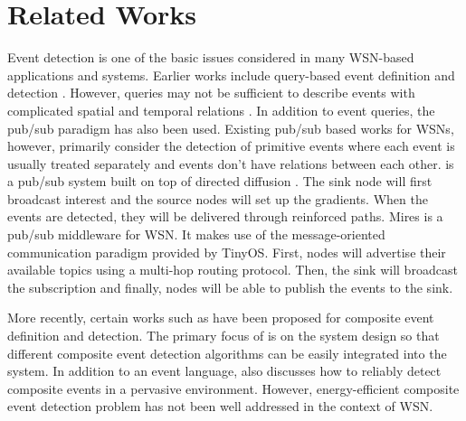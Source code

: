 \section{Related Works}
\label{sec:relatedworks}
Event detection is one of the basic issues considered in many WSN-based applications and systems. Earlier works include query-based event definition and detection \cite{tinydb}. However, queries may not be sufficient to describe events with complicated spatial and temporal relations \cite{cougar}. In addition to event queries, the pub/sub paradigm has also been used.  Existing pub/sub based works for WSNs, however, primarily consider the detection of primitive events where each event is usually treated separately and events don't have relations between each other. \cite{lowlevelnaming} is a pub/sub system built on top of directed diffusion \cite{directeddiffusion}. The sink node will first broadcast interest and the source nodes will set up the gradients. When the events are detected, they will be delivered through reinforced paths. Mires \cite{mires} is a pub/sub middleware for WSN. It makes use of the message-oriented communication paradigm provided by TinyOS. First, nodes will advertise their available topics using a multi-hop routing protocol. Then, the sink will broadcast the subscription and finally, nodes will be able to publish the events to the sink.

More recently, certain works such as \cite{lai:psware, complexevent} have been proposed for composite event definition and detection. The primary focus of \cite{lai:psware} is on the system design so that different composite event detection algorithms can be easily integrated into the system. In addition to an event language, \cite{complexevent} also discusses how to reliably detect composite events in a pervasive environment. However, energy-efficient composite event detection problem has not been well addressed in the context of WSN.

\begin{comment}
Another related area is data aggregation for WSNs and a lot of work has been done. Existing data aggregation can be mainly divided into three categories: cluster-based approach \cite{leach}, chain-based approach \cite{pegasis} and tree-based approach \cite{mfst, xue:lp}.  Cluster-based approach typically considers the problem how to select and rotate cluster heads so that the clusters can be evenly distributed in the network and energy consumption will be balanced \cite{leach}. Cluster-based approach can be organized into multiple levels in order to further save the cost. Chain-based approach improves cluster-based approach by letting each sensor node only communicate with its close neighbors \cite{pegasis}. Tree-based approaches use optimization techniques in graph theory to solve the problem. For example, MFST \cite{mfst} constructs a minimum Steiner tree with a cost model that considers the fusion cost while \cite{xue:lp} formulates the problem into multi-commodity flow problem and uses linear programming to help solving the problem.
\end{comment}

